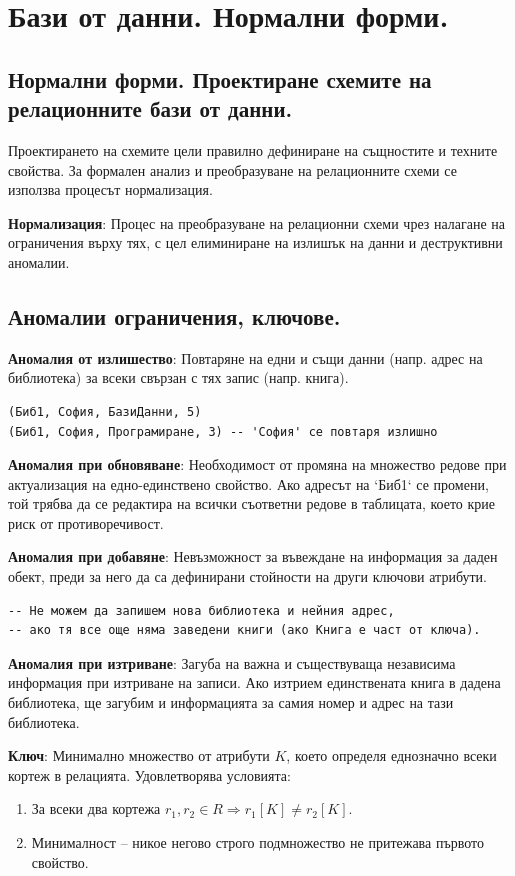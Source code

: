 \documentclass{article}
\renewcommand{\\}{\newline}
\begin{document}
\section{Бази от данни. Нормални форми.}

\subsection{Нормални форми. Проектиране схемите на релационните бази от данни.}
Проектирането на схемите цели правилно дефиниране на същностите и техните свойства. За формален анализ и преобразуване на релационните схеми се използва процесът нормализация.

\textbf{Нормализация}: Процес на преобразуване на релационни схеми чрез налагане на ограничения върху тях, с цел елиминиране на излишък на данни и деструктивни аномалии.

\subsection{Аномалии ограничения, ключове.}

\textbf{Аномалия от излишество}: Повтаряне на едни и същи данни (напр. адрес на библиотека) за всеки свързан с тях запис (напр. книга).
\begin{verbatim}
(Биб1, София, БазиДанни, 5)
(Биб1, София, Програмиране, 3) -- 'София' се повтаря излишно
\end{verbatim}

\textbf{Аномалия при обновяване}: Необходимост от промяна на множество редове при актуализация на едно-единствено свойство. Ако адресът на `Биб1` се промени, той трябва да се редактира на всички съответни редове в таблицата, което крие риск от противоречивост.

\textbf{Аномалия при добавяне}: Невъзможност за въвеждане на информация за даден обект, преди за него да са дефинирани стойности на други ключови атрибути.
\begin{verbatim}
-- Не можем да запишем нова библиотека и нейния адрес,
-- ако тя все още няма заведени книги (ако Книга е част от ключа).
\end{verbatim}

\textbf{Аномалия при изтриване}: Загуба на важна и съществуваща независима информация при изтриване на записи. Ако изтрием единствената книга в дадена библиотека, ще загубим и информацията за самия номер и адрес на тази библиотека.

\textbf{Ключ}: Минимално множество от атрибути $K$, което определя еднозначно всеки кортеж в релацията. Удовлетворява условията:
\begin{enumerate}
\item За всеки два кортежа $r_1, r_2 \in R \Rightarrow r_1[K] \neq r_2[K]$.
\item Минималност – никое негово строго подмножество не притежава първото свойство.
\end{enumerate}
\end{document}
